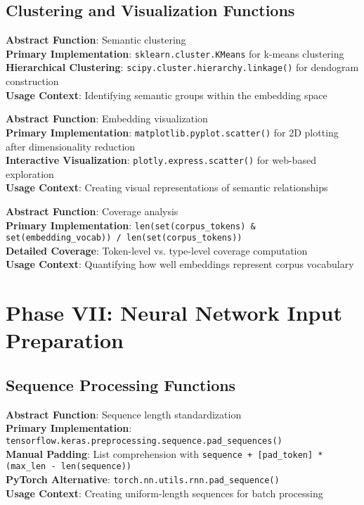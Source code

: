 \documentclass[11pt,a4paper]{article}
\begin{document}
\subsection{Clustering and Visualization Functions}

\textbf{Abstract Function}: Semantic clustering \\
\textbf{Primary Implementation}: \texttt{sklearn.cluster.KMeans} for k-means clustering \\
\textbf{Hierarchical Clustering}: \texttt{scipy.cluster.hierarchy.linkage()} for dendogram construction \\
\textbf{Usage Context}: Identifying semantic groups within the embedding space

\textbf{Abstract Function}: Embedding visualization \\
\textbf{Primary Implementation}: \texttt{matplotlib.pyplot.scatter()} for 2D plotting after dimensionality reduction \\
\textbf{Interactive Visualization}: \texttt{plotly.express.scatter()} for web-based exploration \\
\textbf{Usage Context}: Creating visual representations of semantic relationships

\textbf{Abstract Function}: Coverage analysis \\
\textbf{Primary Implementation}: \texttt{len(set(corpus\_tokens) \& set(embedding\_vocab)) / len(set(corpus\_tokens))} \\
\textbf{Detailed Coverage}: Token-level vs. type-level coverage computation \\
\textbf{Usage Context}: Quantifying how well embeddings represent corpus vocabulary

\section{Phase VII: Neural Network Input Preparation}

\subsection{Sequence Processing Functions}

\textbf{Abstract Function}: Sequence length standardization \\
\textbf{Primary Implementation}: \texttt{tensorflow.keras.preprocessing.sequence.pad\_sequences()} \\
\textbf{Manual Padding}: List comprehension with \texttt{sequence + [pad\_token] * (max\_len - len(sequence))} \\
\textbf{PyTorch Alternative}: \texttt{torch.nn.utils.rnn.pad\_sequence()} \\
\textbf{Usage Context}: Creating uniform-length sequences for batch processing
\end{document}
